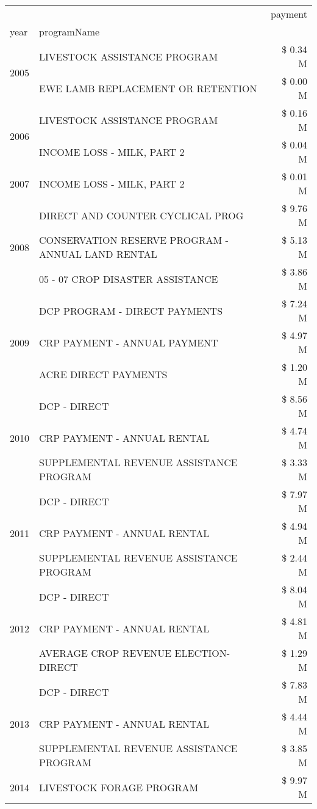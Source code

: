 \begin{tabular}{llr}
\toprule
 &  & payment \\
year & programName &  \\
\midrule
\multirow[t]{2}{*}{2005} & LIVESTOCK ASSISTANCE PROGRAM & \$ 0.34 M \\
 & EWE LAMB REPLACEMENT OR RETENTION & \$ 0.00 M \\
\cline{1-3}
\multirow[t]{2}{*}{2006} & LIVESTOCK ASSISTANCE PROGRAM & \$ 0.16 M \\
 & INCOME LOSS - MILK, PART 2 & \$ 0.04 M \\
\cline{1-3}
2007 & INCOME LOSS - MILK, PART 2 & \$ 0.01 M \\
\cline{1-3}
\multirow[t]{3}{*}{2008} & DIRECT AND COUNTER CYCLICAL PROG & \$ 9.76 M \\
 & CONSERVATION RESERVE PROGRAM - ANNUAL LAND RENTAL & \$ 5.13 M \\
 & 05 - 07 CROP DISASTER ASSISTANCE & \$ 3.86 M \\
\cline{1-3}
\multirow[t]{3}{*}{2009} & DCP PROGRAM - DIRECT PAYMENTS & \$ 7.24 M \\
 & CRP PAYMENT - ANNUAL PAYMENT & \$ 4.97 M \\
 & ACRE DIRECT PAYMENTS & \$ 1.20 M \\
\cline{1-3}
\multirow[t]{3}{*}{2010} & DCP - DIRECT & \$ 8.56 M \\
 & CRP PAYMENT - ANNUAL RENTAL & \$ 4.74 M \\
 & SUPPLEMENTAL REVENUE ASSISTANCE PROGRAM & \$ 3.33 M \\
\cline{1-3}
\multirow[t]{3}{*}{2011} & DCP - DIRECT & \$ 7.97 M \\
 & CRP PAYMENT - ANNUAL RENTAL & \$ 4.94 M \\
 & SUPPLEMENTAL REVENUE ASSISTANCE PROGRAM & \$ 2.44 M \\
\cline{1-3}
\multirow[t]{3}{*}{2012} & DCP - DIRECT & \$ 8.04 M \\
 & CRP PAYMENT - ANNUAL RENTAL & \$ 4.81 M \\
 & AVERAGE CROP REVENUE ELECTION-DIRECT & \$ 1.29 M \\
\cline{1-3}
\multirow[t]{3}{*}{2013} & DCP - DIRECT & \$ 7.83 M \\
 & CRP PAYMENT - ANNUAL RENTAL & \$ 4.44 M \\
 & SUPPLEMENTAL REVENUE ASSISTANCE PROGRAM & \$ 3.85 M \\
\cline{1-3}
\multirow[t]{3}{*}{2014} & LIVESTOCK FORAGE PROGRAM & \$ 9.97 M \\

\end{tabular}
